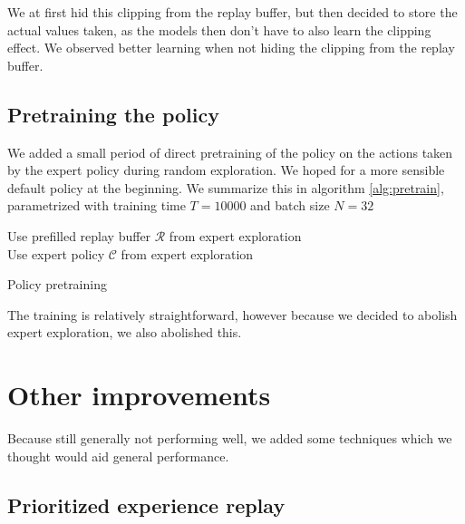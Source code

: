 \documentclass[hyperref,beleg]{cgvpub}
\begin{document}
We at first hid this clipping from the replay buffer, but then decided to store the actual values taken, as the models then don't have to also learn the clipping effect. We observed better learning when not hiding the clipping from the replay buffer.

\subsection{Pretraining the policy}
\label{sec:pretrain}

We added a small period of direct pretraining of the policy on the actions taken by the expert policy during random exploration. We hoped for a more sensible default policy at the beginning. We summarize this in algorithm \ref{alg:pretrain}, parametrized with training time $T=10000$ and batch size $N=32$

\begin{algorithm}
\SetAlgoLined
Use prefilled replay buffer $\mathcal{R}$ from expert exploration\\
Use expert policy $\mathcal{C}$ from expert exploration\\
\caption{Policy pretraining}
\label{alg:pretrain}
\end{algorithm}

The training is relatively straightforward, however because we decided to abolish expert exploration, we also abolished this.

\section{Other improvements}

Because still generally not performing well, we added some techniques which we thought would aid general performance.

\subsection{Prioritized experience replay}
\end{document}
